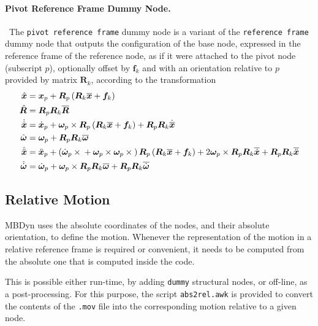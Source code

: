 \documentclass[10pt,dvips,fleqn,subeqn]{report}
\newcommand{\T}[1]{\bm{#1}}
\newcommand{\TT}[1]{\bm{#1}}
\begin{document}
\paragraph{Pivot Reference Frame Dummy Node.} \
The \texttt{pivot reference frame} dummy node is a variant
of the \texttt{reference frame} dummy node that outputs
the configuration of the base node, expressed in the reference
frame of the reference node, as if it were attached to the pivot node
(subscript $p$), optionally offset by $\T{f}_k$ and with
an orientation relative to $p$ provided by matrix $\T{R}_k$,
according to the transformation
\begin{subequations}
\begin{align}
	\hat{\T{x}} &= \T{x}_p + \T{R}_p\plbr{\T{R}_k \overline{\T{x}} + \T{f}_k} \\
	\hat{\T{R}} &= \T{R}_p \T{R}_k \overline{\T{R}} \\
	\dot{\hat{\T{x}}} &= \dot{\T{x}}_p
		+ \T{\omega}_p \times\T{R}_p \plbr{
			\T{R}_k \overline{\T{x}} + \T{f}_k
		} + \T{R}_p \T{R}_k \dot{\overline{\T{x}}} \\
	\hat{\T{\omega}} &= \T{\omega}_p + \T{R}_p \T{R}_k \overline{\T{\omega}} \\
	\hat{\ddot{\T{x}}} &= \ddot{\T{x}}_p
		+ \plbr{
			\dot{\T{\omega}}_p \times{}
			+ \T{\omega}_p \times \T{\omega}_p \times{}
		} \TT{R}_p \plbr{
			\TT{R}_k \overline{\T{x}} + \T{f}_k
		}
		+ 2 \T{\omega}_p \times \TT{R}_p \TT{R}_k \overline{\dot{\T{x}}}
		+ \TT{R}_p \TT{R}_k \overline{\ddot{\T{x}}} \\
	\hat{\dot{\T{\omega}}} &= \dot{\T{\omega}}_p
		+ \T{\omega}_p \times \TT{R}_p \TT{R}_k \overline{\T{\omega}}
		+ \TT{R}_p \TT{R}_k \overline{\dot{\T{\omega}}}
\end{align}
\end{subequations}


\subsection{Relative Motion}
\label{sec:nodes:structural nodes:relative motion}
MBDyn uses the absolute coordinates of the nodes,
and their absolute orientation, to define the motion.
Whenever the representation of the motion in a relative reference frame
is required or convenient, it needs to be computed
from the absolute one that is computed inside the code.

This is possible either run-time, by adding \texttt{dummy} structural nodes,
or off-line, as a post-processing.
For this purpose, the script \texttt{abs2rel.awk} is provided
to convert the contents of the \texttt{.mov} file
into the corresponding motion relative to a given node.
\end{document}
